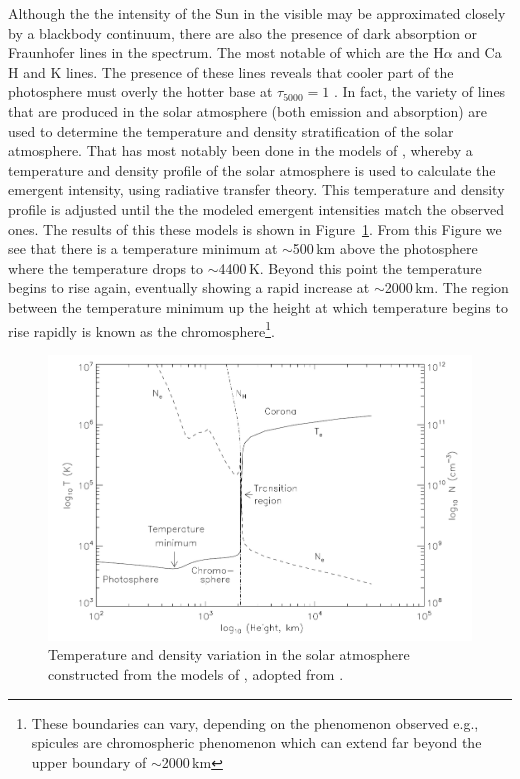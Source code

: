 Although the the intensity of the Sun in the visible may be approximated closely by a blackbody continuum, there are also the presence of dark absorption or Fraunhofer lines in the spectrum. The most notable of which are the H$\alpha$ and Ca H and K lines.  The presence of these lines reveals that cooler part of the photosphere must overly the hotter base at $\tau_{5000}=1$ \citep{phillips2008}. In fact, the variety of lines that are produced in the solar atmosphere (both emission and absorption) are used to determine the temperature and density stratification of the solar atmosphere.  That has most notably been done in the models of \citep{vernazza1981, fontenla1988, gabriel1976}, whereby a temperature and density profile of the solar atmosphere is used to calculate the emergent intensity, using radiative transfer theory. This temperature and density profile is adjusted until the the modeled emergent intensities match the observed ones. The results of this these models is shown in Figure~\ref{fig:val}. From this Figure we see that there is a temperature minimum at $\sim$500\,km above the photosphere where the temperature drops to $\sim$4400\,K. Beyond this point the temperature begins to rise again, eventually showing a rapid increase at $\sim$2000\,km. The region between the temperature minimum up the height at which temperature begins to rise rapidly is known as the chromosphere\footnote{These boundaries can vary, depending on the phenomenon observed e.g., spicules are chromospheric phenomenon which can extend far beyond the upper boundary of $\sim$2000\,km}. 


\begin{figure}[!t]
\begin{center}
\includegraphics[scale=0.3]{images/VAL.png}
\caption[The temperature and density as a function of height above the photosphere]{Temperature and density variation in the solar atmosphere constructed from the models of \citep{vernazza1981, fontenla1988, gabriel1976}, adopted from \citep{phillips2008}.}
\label{fig:val} 
\end{center}
\end{figure}


